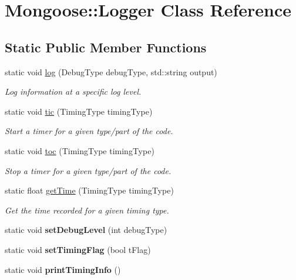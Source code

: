\hypertarget{class_mongoose_1_1_logger}{}\section{Mongoose\+:\+:Logger Class Reference}
\label{class_mongoose_1_1_logger}
\subsection*{Static Public Member Functions}
\begin{DoxyCompactItemize}
\item 
static void \hyperlink{class_mongoose_1_1_logger_a130663fe3867cc5adae16dcf7f65f2a5}{log} (Debug\+Type debug\+Type, std\+::string output)
\begin{DoxyCompactList}\small\item\em Log information at a specific log level. \end{DoxyCompactList}\item 
static void \hyperlink{class_mongoose_1_1_logger_afaa4ac7914bc5536fbe765ad2b4806d8}{tic} (Timing\+Type timing\+Type)
\begin{DoxyCompactList}\small\item\em Start a timer for a given type/part of the code. \end{DoxyCompactList}\item 
static void \hyperlink{class_mongoose_1_1_logger_af50c5bd571bfae78a27ff49b2c5bb6d3}{toc} (Timing\+Type timing\+Type)
\begin{DoxyCompactList}\small\item\em Stop a timer for a given type/part of the code. \end{DoxyCompactList}\item 
static float \hyperlink{class_mongoose_1_1_logger_a9f74771ff530c41f98ee090f3a1897eb}{get\+Time} (Timing\+Type timing\+Type)
\begin{DoxyCompactList}\small\item\em Get the time recorded for a given timing type. \end{DoxyCompactList}\item 
\hypertarget{class_mongoose_1_1_logger_a699ce4ccb6d373e87dd726bc98e1ae75}{}\label{class_mongoose_1_1_logger_a699ce4ccb6d373e87dd726bc98e1ae75} 
static void {\bfseries set\+Debug\+Level} (int debug\+Type)
\item 
\hypertarget{class_mongoose_1_1_logger_ab4ad6a4d72f8052a4093c3bc9f047f5a}{}\label{class_mongoose_1_1_logger_ab4ad6a4d72f8052a4093c3bc9f047f5a} 
static void {\bfseries set\+Timing\+Flag} (bool t\+Flag)
\item 
\hypertarget{class_mongoose_1_1_logger_a44810a0ae400e8f6a8067dea2ee32102}{}\label{class_mongoose_1_1_logger_a44810a0ae400e8f6a8067dea2ee32102} 
static void {\bfseries print\+Timing\+Info} ()
\end{DoxyCompactItemize}



